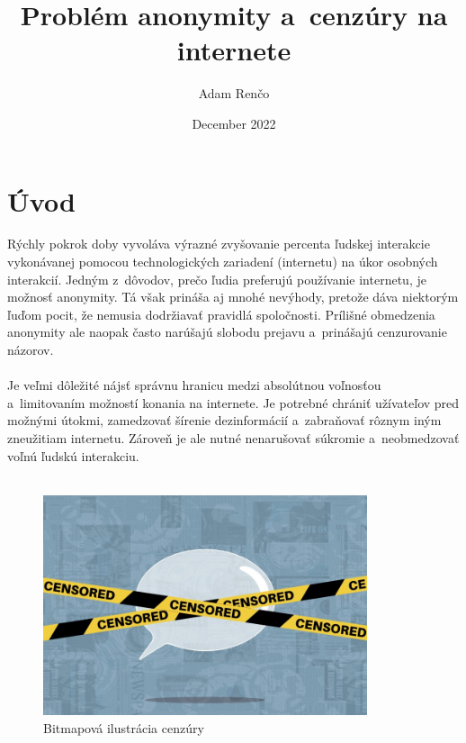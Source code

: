 \documentclass{artikel1}
\title{Problém anonymity a~cenzúry na internete}
\author{Adam Renčo}
\date{December 2022}
\begin{document}
\setcounter{page}{1}
\maketitle

\section{Úvod}

Rýchly pokrok doby  vyvoláva výrazné zvyšovanie percenta ľudskej interakcie vykonávanej pomocou technologických zariadení (internetu)  na úkor osobných interakcií. Jedným z~dôvodov, prečo ľudia preferujú používanie internetu, je možnosť  anonymity. Tá však prináša aj mnohé nevýhody, pretože dáva niektorým ľuďom pocit, že nemusia dodržiavať pravidlá spoločnosti. Prílišné obmedzenia anonymity ale naopak často narúšajú slobodu prejavu a~prinášajú cenzurovanie názorov.\\\\
Je veľmi dôležité nájsť správnu hranicu medzi absolútnou voľnosťou a~limitovaním možností konania na internete. Je potrebné chrániť užívateľov pred možnými útokmi, zamedzovať šírenie dezinformácií a~zabraňovať rôznym iným zneužitiam internetu. Zároveň je ale nutné nenarušovať súkromie a~neobmedzovať voľnú ľudskú interakciu.\\\\

\begin{figure}[htbp]
    \begin{center}
        \includegraphics[width=0.85\textwidth]{censor}
    \end{center}
    \caption{Bitmapová ilustrácia cenzúry}
    \label{censor}
\end{figure}
\end{document}

